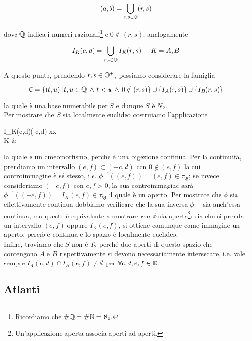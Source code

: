 \begin{equation}
	(a,b) = \bigcup_{r,s \in \mathbb{Q}} (r,s)
\end{equation}

dove $ \mathbb{Q} $ indica i numeri razionali\footnote{%
	Ricordiamo che $ \# \mathbb{Q} = \# \mathbb{N} = \aleph_{0} $.%
} e $ 0 \notin (r,s) $; analogamente

\begin{equation}
	I_{K}(c,d) = \bigcup_{r,s \in \Q} I_{K}(r,s) \qcomma K = A, B
\end{equation}

A questo punto, prendendo $ r, s \in \mathbb{Q}^{+} $, possiamo considerare la famiglia

\begin{equation}
	\mathfrak{C} = \left\{ (t,u) \, \middle| \, t,u \in \mathbb{Q} \, \wedge \, t < u \, \wedge \, 0 \notin (r,s) \right\} \cup \left\{ I_{A}(r,s) \right\} \cup \left\{ I_{B}(r,s) \right\}
\end{equation}

la quale è una base numerabile per $ S $ e dunque $ S $ è $ N_{2} $.\\
Per mostrare che $ S $ sia localmente euclideo costruiamo l'applicazione

\map{\phi}
	{I_{K}(c,d)}{(-c,d) \subset \R}
	{x}{x\\
	K &}

la quale è un omeomorfismo, perché è una bigezione continua. Per la continuità, prendiamo un intervallo $ (e,f) \subset (-c,d) $ con $ 0 \notin (e,f) $ la cui controimmagine è sé stesso, i.e. $ \phi^{-1}((e,f)) = (e,f) \in \tau_{\mathfrak{B}} $; se invece consideriamo $ (-e,f) $ con $ e,f>0 $, la sua controimmagine sarà $ \phi^{-1}((-e,f)) = I_{K}(e,f) \in \tau_{\mathfrak{B}} $ il quale è un aperto. Per mostrare che $ \phi $ sia effettivamente continua dobbiamo verificare che la sua inversa $ \phi^{-1} $ sia anch'essa continua, ma questo è equivalente a mostrare che $ \phi $ sia aperta\footnote{%
	Un'applicazione aperta associa aperti ad aperti.%
}: sia che si prenda un intervallo $ (e,f) $ oppure $ I_{K}(e,f) $, si ottiene comunque come immagine un aperto, perciò è continua e lo spazio è localmente euclideo.\\
Infine, troviamo che $ S $ non è $ T_{2} $ perché due aperti di questo spazio che contengono $ A $ e $ B $ rispettivamente si devono necessariamente intersecare, i.e. vale sempre $ I_{A}(c,d) \cap I_{B}(e,f) \neq \emptyset $ per $ \forall c, d, e, f \in \mathbb{R} $.

\subsection{Atlanti}

